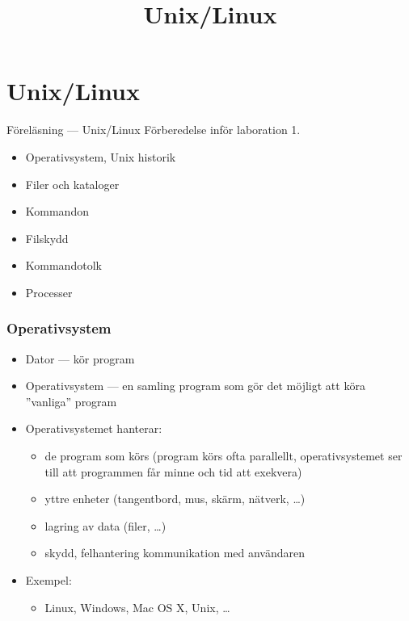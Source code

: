 
\title{Unix/Linux}
\section{Unix/Linux}

\begin{frame}
    \label{unix}
    \begin{block}{\centering\Large Föreläsning  --- Unix/Linux}
        Förberedelse inför laboration 1.

        \begin{itemize}
            \item Operativsystem, Unix historik
            \item Filer och kataloger
            \item Kommandon
            \item Filskydd
            \item Kommandotolk
            \item Processer
        \end{itemize}
    \end{block}
\end{frame}


\begin{frame}[fragile=singleslide]
    \frametitle{Operativsystem}
    \begin{itemize}
        \item Dator --- kör program
        \item Operativsystem --- en samling program som gör det möjligt att köra ''vanliga'' program
        \item Operativsystemet hanterar:
              \begin{itemize}
                  \item de program som körs (program körs ofta parallellt, operativsystemet ser till att programmen får minne och tid att exekvera)
                  \item yttre enheter (tangentbord, mus, skärm, nätverk, \ldots)
                  \item lagring av data (filer, \ldots)
                  \item skydd, felhantering
                        kommunikation med användaren
              \end{itemize}

        \item Exempel:
              \begin{itemize}
                  \item Linux, Windows, Mac OS X, Unix, \ldots
              \end{itemize}
    \end{itemize}
\end{frame}



